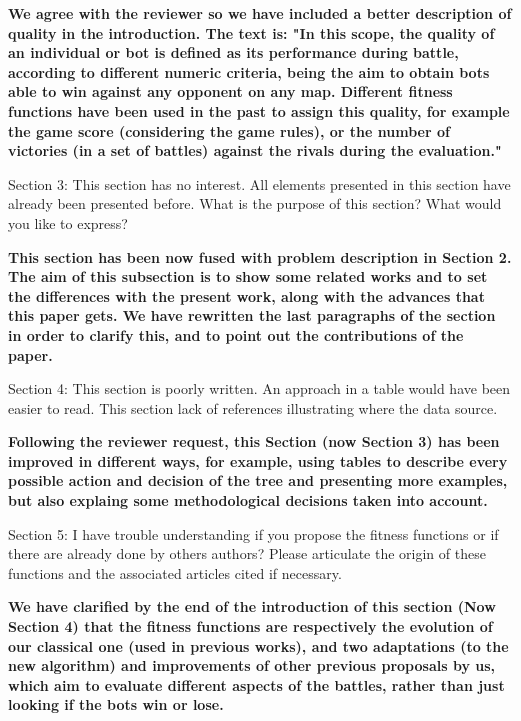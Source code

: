 \documentclass{article}
\begin{document}
\vspace{0.5cm} \textbf{We agree with the reviewer so we have included a better description of quality in the introduction. The text is:
"In this scope, the quality of an individual or bot is defined as its performance during battle, according to different numeric criteria, being the aim to obtain bots able to win against any opponent on any map.
Different fitness functions have been used in the past to assign this quality, for example the game score (considering the game rules), or the number of victories (in a set of battles) against the rivals during the evaluation."} \vspace{0.5cm}


Section 3: This section has no interest. All elements presented in this section have already been presented before. What is the purpose of this section? What would you like to express?

\vspace{0.5cm} \textbf{This section has been now fused with problem description in Section 2. The aim of this subsection is to show some related works and to set the differences with the present work, along with the advances that this paper gets. We have rewritten the last paragraphs of the section in order to clarify this, and to point out the contributions of the paper.} \vspace{0.5cm}


Section 4: This section is poorly written. An approach in a table would have been easier to read. This section lack of references illustrating where the data source.

\vspace{0.5cm} \textbf{Following the reviewer request, this Section (now Section 3) has been improved in different ways, for example, using tables to describe every possible action and decision of the tree and presenting more examples, but also explaing some methodological decisions taken into account.} \vspace{0.5cm}


Section 5: I have trouble understanding if you propose the fitness functions or if there are already done by others authors? Please articulate the origin of these functions and the associated articles cited if necessary.

\vspace{0.5cm} \textbf{We have clarified by the end of the introduction of this section (Now Section 4) that the fitness functions are respectively the evolution of our classical one (used in previous works), and two adaptations (to the new algorithm) and improvements of other previous proposals by us, which aim to evaluate different aspects of the battles, rather than just looking if the bots win or lose.} \vspace{0.5cm}
\end{document}
